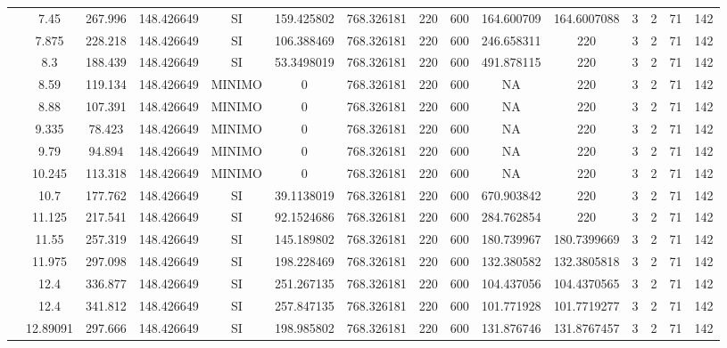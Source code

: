 \begin{table}[H]
{\begin{tabular}{|c|c|c|c|c|c|c|c|c|c|c|c|c|c|c|}
\cline{2-15}    & 7.45 & 267.996 & 148.426649 & SI  & 159.425802 & 768.326181 & 220 & 600 & 164.600709 & 164.6007088 & 3   & 2   & 71  & 142 \bigstrut\\
\cline{2-15}    & 7.875 & 228.218 & 148.426649 & SI  & 106.388469 & 768.326181 & 220 & 600 & 246.658311 & 220 & 3   & 2   & 71  & 142 \bigstrut\\
\cline{2-15}    & 8.3 & 188.439 & 148.426649 & SI  & 53.3498019 & 768.326181 & 220 & 600 & 491.878115 & 220 & 3   & 2   & 71  & 142 \bigstrut\\
\cline{2-15}    & 8.59 & 119.134 & 148.426649 & MINIMO & 0   & 768.326181 & 220 & 600 & NA  & 220 & 3   & 2   & 71  & 142 \bigstrut\\
\cline{2-15}    & 8.88 & 107.391 & 148.426649 & MINIMO & 0   & 768.326181 & 220 & 600 & NA  & 220 & 3   & 2   & 71  & 142 \bigstrut\\
\cline{2-15}    & 9.335 & 78.423 & 148.426649 & MINIMO & 0   & 768.326181 & 220 & 600 & NA  & 220 & 3   & 2   & 71  & 142 \bigstrut\\
\cline{2-15}    & 9.79 & 94.894 & 148.426649 & MINIMO & 0   & 768.326181 & 220 & 600 & NA  & 220 & 3   & 2   & 71  & 142 \bigstrut\\
\cline{2-15}    & 10.245 & 113.318 & 148.426649 & MINIMO & 0   & 768.326181 & 220 & 600 & NA  & 220 & 3   & 2   & 71  & 142 \bigstrut\\
\cline{2-15}    & 10.7 & 177.762 & 148.426649 & SI  & 39.1138019 & 768.326181 & 220 & 600 & 670.903842 & 220 & 3   & 2   & 71  & 142 \bigstrut\\
\cline{2-15}    & 11.125 & 217.541 & 148.426649 & SI  & 92.1524686 & 768.326181 & 220 & 600 & 284.762854 & 220 & 3   & 2   & 71  & 142 \bigstrut\\
\cline{2-15}    & 11.55 & 257.319 & 148.426649 & SI  & 145.189802 & 768.326181 & 220 & 600 & 180.739967 & 180.7399669 & 3   & 2   & 71  & 142 \bigstrut\\
\cline{2-15}    & 11.975 & 297.098 & 148.426649 & SI  & 198.228469 & 768.326181 & 220 & 600 & 132.380582 & 132.3805818 & 3   & 2   & 71  & 142 \bigstrut\\
\cline{2-15}    & 12.4 & 336.877 & 148.426649 & SI  & 251.267135 & 768.326181 & 220 & 600 & 104.437056 & 104.4370565 & 3   & 2   & 71  & 142 \bigstrut\\
\cline{2-15}    & 12.4 & 341.812 & 148.426649 & SI  & 257.847135 & 768.326181 & 220 & 600 & 101.771928 & 101.7719277 & 3   & 2   & 71  & 142 \bigstrut\\
\cline{2-15}    & 12.89091 & 297.666 & 148.426649 & SI  & 198.985802 & 768.326181 & 220 & 600 & 131.876746 & 131.8767457 & 3   & 2   & 71  & 142 \bigstrut\\

\end{tabular}}
\end{table}
